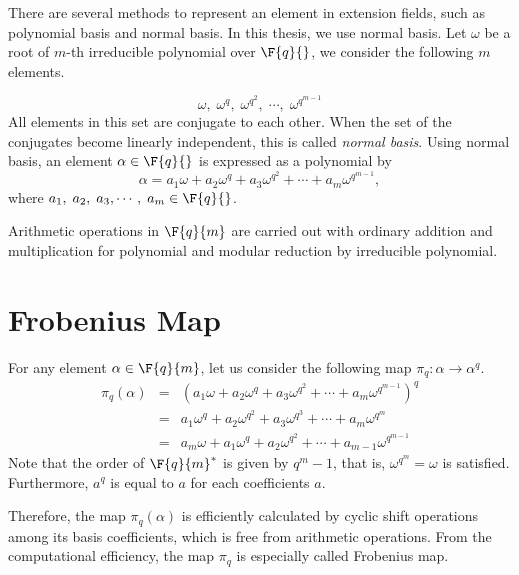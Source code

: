 There are several methods to represent an element in extension fields, such as polynomial basis and normal basis.
In this thesis, we use normal basis.
Let $\omega$ be a root of $m$-th irreducible polynomial over $\F{q}{}$, we consider the following $m$ elements.

\begin{equation}
\omega,\;\omega^q,\;\omega^{q^2},\;\cdots,\;\omega^{q^{m-1}} \nonumber
\end{equation}
All elements in this set are conjugate to each other.
When the set of the conjugates become linearly independent, this is called {\it normal basis}.
Using normal basis, an element $\alpha \in \F{q}{}$ is expressed as a polynomial by  
\begin{equation}
\alpha = a_1 \omega + a_2 \omega^q + a_3 \omega^{q^2} + \cdots + a_m \omega^{q^{m-1}}, 
\end{equation}
where $a_1,\;a_2,\;a_3,\cdots,\;a_m \in \F{q}{}$.

Arithmetic operations in $\F{q}{m}$ are carried out with ordinary addition and multiplication for polynomial and modular reduction by irreducible polynomial.

\section{Frobenius Map}\label{secFrob}

For any element $\alpha \in \F{q}{m}$, let us consider the following map $\pi_q:\alpha \rightarrow \alpha^q$. 
\begin{eqnarray}
\pi_q(\alpha) &=& \left( a_1 \omega + a_2 \omega^q + a_3 \omega^{q^2} + \cdots + a_m \omega^{q^{m-1}} \right)^q \nonumber \\ 
&=& a_1 \omega^q + a_2 \omega^{q^2} + a_3 \omega^{q^3} + \cdots + a_m \omega^{q^m} \nonumber \\
&=& a_m \omega + a_1 \omega^q + a_2 \omega^{q^2} + \cdots + a_{m-1} \omega^{q^{m-1}}
\end{eqnarray}
Note that the order of $\F{q}{m}^*$ is given by $q^m - 1$, that is,  $\omega^{q^m} = \omega$ is satisfied.
Furthermore, $a^q$ is equal to $a$ for each coefficients $a$.

Therefore, the map $\pi_q(\alpha)$ is efficiently calculated by cyclic shift operations among its basis coefficients, 
which is free from arithmetic operations.
From the computational efficiency, the map $\pi_q$ is especially called Frobenius map.


